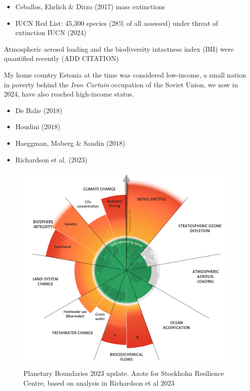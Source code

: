 \documentclass[
  letterpaper,
  DIV=11,
  numbers=noendperiod]{scrartcl}
\providecommand{\tightlist}{%
  \setlength{\itemsep}{0pt}\setlength{\parskip}{0pt}}\usepackage{longtable,booktabs,array}
\begin{document}
\begin{itemize}
\tightlist
\item
  Ceballos, Ehrlich \& Dirzo (2017) mass extinctions
\item
  IUCN Red List: 45,300 species (28\% of all assessed) under threat of
  extinction IUCN (2024)
\end{itemize}

Atmospheric aerosol loading and the biodiversity intactness index (BII)
were quantified recently (ADD CITATION)

My home country Estonia at the time was considered low-income, a small
nation in poverty behind the \emph{Iron Curtain} occupation of the
Soviet Union, we now in 2024, have also reached high-income status.

\begin{itemize}
\item
  De Balie (2018)
\item
  Houdini (2018)
\item
  Haeggman, Moberg \& Sandin (2018)
\item
  Richardson et al. (2023)
\end{itemize}

\begin{figure}[H]

{\centering \includegraphics[width=1\textwidth,height=\textheight]{./images/sustainability/planetary-boundaries-2023.png}

}

\caption{Planetary Boundaries 2023 update. Azote for Stockholm
Resilience Centre, based on analysis in Richardson et al 2023}

\end{figure}%
\end{document}
